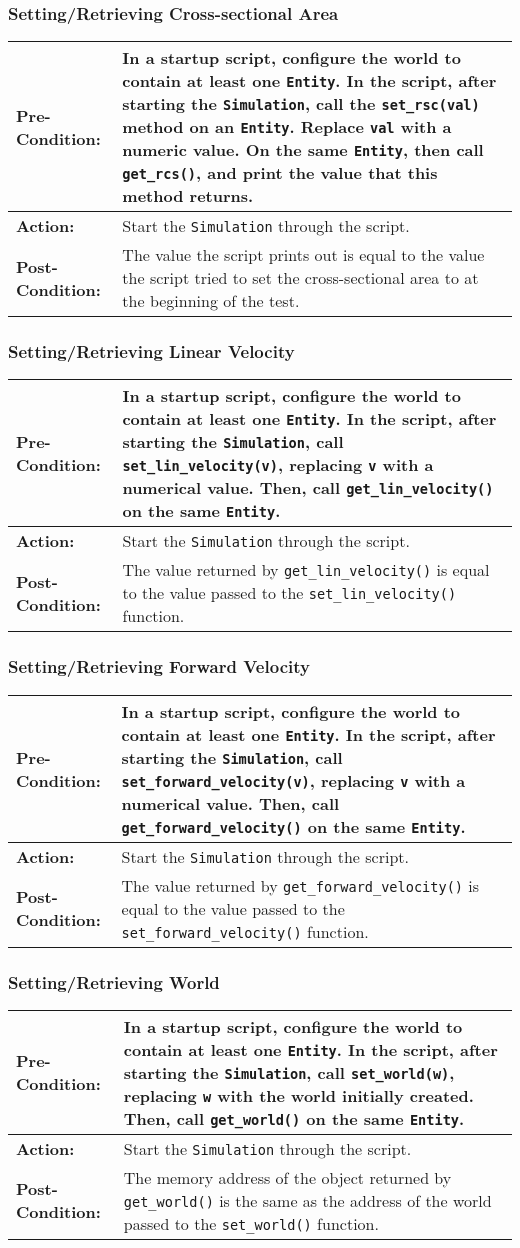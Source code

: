 \documentclass[titlepage]{article}
\newcommand{\testcase}[3]{
    \begin{center}
    \begin{tabular}{| l | p{0.7\textwidth}|}
        \hline
        \rowcolor[gray]{0.8}\textbf{Pre-Condition:} & #1 \\ \hline
        \textbf{Action:} & #2 \\ \hline
        \rowcolor[gray]{0.8}\textbf{Post-Condition:} & #3 \\ \hline
    \end{tabular}
    \end{center}
}
\begin{document}
\subsubsection{Setting/Retrieving Cross-sectional Area}
\testcase{In a startup script, configure the world to contain at least one \texttt{Entity}. In the script, after starting the \texttt{Simulation}, call the \texttt{set\_rsc(val)} method on an \texttt{Entity}. Replace \texttt{val} with a numeric value. On the same \texttt{Entity}, then call \texttt{get\_rcs()}, and print the value that this method returns.}{Start the \texttt{Simulation} through the script.}{The value the script prints out is equal to the value the script tried to set the cross-sectional area to at the beginning of the test.}

\subsubsection{Setting/Retrieving Linear Velocity}
\testcase{In a startup script, configure the world to contain at least one \texttt{Entity}. In the script, after starting the \texttt{Simulation}, call \texttt{set\_lin\_velocity(v)}, replacing \texttt{v} with a numerical value. Then, call \texttt{get\_lin\_velocity()} on the same \texttt{Entity}.}{Start the \texttt{Simulation} through the script.}{The value returned by \texttt{get\_lin\_velocity()} is equal to the value passed to the \texttt{set\_lin\_velocity()} function.}

\subsubsection{Setting/Retrieving Forward Velocity}
\testcase{In a startup script, configure the world to contain at least one \texttt{Entity}. In the script, after starting the \texttt{Simulation}, call \texttt{set\_forward\_velocity(v)}, replacing \texttt{v} with a numerical value. Then, call \texttt{get\_forward\_velocity()} on the same \texttt{Entity}.}{Start the \texttt{Simulation} through the script.}{The value returned by \texttt{get\_forward\_velocity()} is equal to the value passed to the \texttt{set\_forward\_velocity()} function.}

\subsubsection{Setting/Retrieving World}
\testcase{In a startup script, configure the world to contain at least one \texttt{Entity}. In the script, after starting the \texttt{Simulation}, call \texttt{set\_world(w)}, replacing \texttt{w} with the world initially created. Then, call \texttt{get\_world()} on the same \texttt{Entity}.}{Start the \texttt{Simulation} through the script.}{The memory address of the object returned by \texttt{get\_world()} is the same as the address of the world passed to the \texttt{set\_world()} function.}
\end{document}
